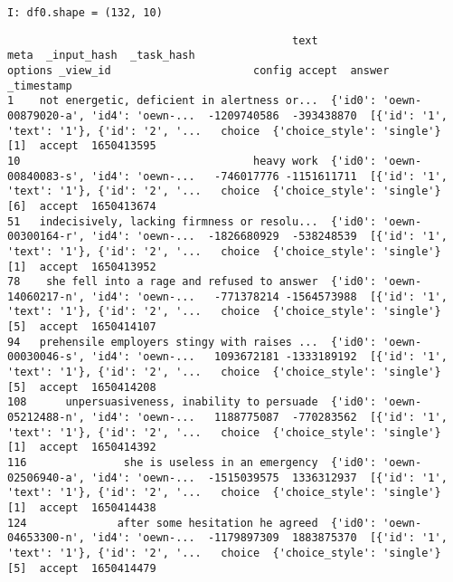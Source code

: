 \documentclass[a4paper,10pt,onecolumn,oneside,openright]{article}
\begin{document}
\begin{verbatim}
I: df0.shape = (132, 10)
\end{verbatim}
\begin{verbatim}
                                            text                                         meta  _input_hash  _task_hash                                      options _view_id                      config accept  answer  _timestamp
1    not energetic, deficient in alertness or...  {'id0': 'oewn-00879020-a', 'id4': 'oewn-...  -1209740586  -393438870  [{'id': '1', 'text': '1'}, {'id': '2', '...   choice  {'choice_style': 'single'}    [1]  accept  1650413595
10                                    heavy work  {'id0': 'oewn-00840083-s', 'id4': 'oewn-...   -746017776 -1151611711  [{'id': '1', 'text': '1'}, {'id': '2', '...   choice  {'choice_style': 'single'}    [6]  accept  1650413674
51   indecisively, lacking firmness or resolu...  {'id0': 'oewn-00300164-r', 'id4': 'oewn-...  -1826680929  -538248539  [{'id': '1', 'text': '1'}, {'id': '2', '...   choice  {'choice_style': 'single'}    [1]  accept  1650413952
78    she fell into a rage and refused to answer  {'id0': 'oewn-14060217-n', 'id4': 'oewn-...   -771378214 -1564573988  [{'id': '1', 'text': '1'}, {'id': '2', '...   choice  {'choice_style': 'single'}    [5]  accept  1650414107
94   prehensile employers stingy with raises ...  {'id0': 'oewn-00030046-s', 'id4': 'oewn-...   1093672181 -1333189192  [{'id': '1', 'text': '1'}, {'id': '2', '...   choice  {'choice_style': 'single'}    [5]  accept  1650414208
108      unpersuasiveness, inability to persuade  {'id0': 'oewn-05212488-n', 'id4': 'oewn-...   1188775087  -770283562  [{'id': '1', 'text': '1'}, {'id': '2', '...   choice  {'choice_style': 'single'}    [1]  accept  1650414392
116               she is useless in an emergency  {'id0': 'oewn-02506940-a', 'id4': 'oewn-...  -1515039575  1336312937  [{'id': '1', 'text': '1'}, {'id': '2', '...   choice  {'choice_style': 'single'}    [1]  accept  1650414438
124              after some hesitation he agreed  {'id0': 'oewn-04653300-n', 'id4': 'oewn-...  -1179897309  1883875370  [{'id': '1', 'text': '1'}, {'id': '2', '...   choice  {'choice_style': 'single'}    [5]  accept  1650414479
\end{verbatim}
\end{document}
